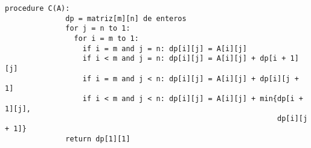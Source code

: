 \documentclass[spanish]{beamer}
\begin{document}
    \newsavebox{\algoritmoBottomUp}
    \begin{lrbox}{\algoritmoBottomUp}
        \begin{lstlisting}[gobble=12]
            procedure C(A):
              dp = matriz[m][n] de enteros
              for j = n to 1:
                for i = m to 1:
                  if i = m and j = n: dp[i][j] = A[i][j]
                  if i < m and j = n: dp[i][j] = A[i][j] + dp[i + 1][j]
                  if i = m and j < n: dp[i][j] = A[i][j] + dp[i][j + 1]
                  if i < m and j < n: dp[i][j] = A[i][j] + min{dp[i + 1][j],
                                                               dp[i][j + 1]}
              return dp[1][1]
        \end{lstlisting}
    \end{lrbox}
\end{document}

